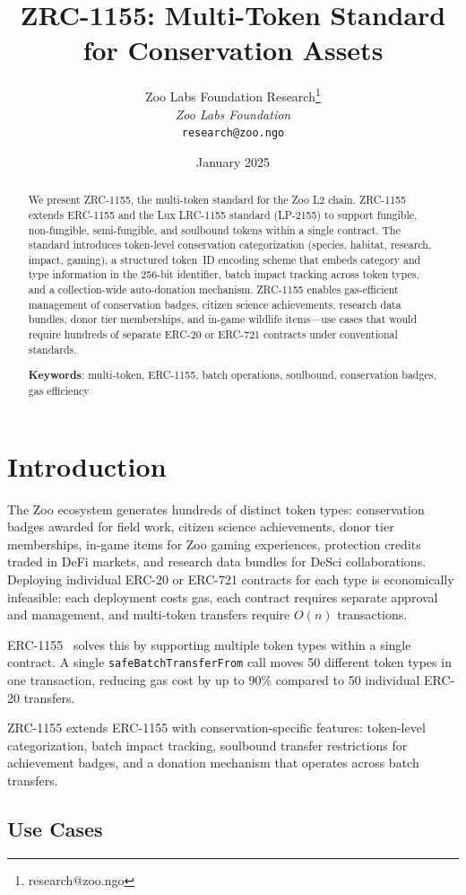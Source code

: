\documentclass[11pt,letterpaper]{article}
\title{\textbf{ZRC-1155: Multi-Token Standard for Conservation Assets}}
\author{
Zoo Labs Foundation Research\thanks{research@zoo.ngo}\\
\textit{Zoo Labs Foundation}\\
\texttt{research@zoo.ngo}
}
\date{January 2025}
\begin{document}
\zoocoverpage

\begin{abstract}
We present ZRC-1155, the multi-token standard for the Zoo L2 chain. ZRC-1155 extends ERC-1155 and the Lux LRC-1155 standard (LP-2155) to support fungible, non-fungible, semi-fungible, and soulbound tokens within a single contract. The standard introduces token-level conservation categorization (species, habitat, research, impact, gaming), a structured token~ID encoding scheme that embeds category and type information in the 256-bit identifier, batch impact tracking across token types, and a collection-wide auto-donation mechanism. ZRC-1155 enables gas-efficient management of conservation badges, citizen science achievements, research data bundles, donor tier memberships, and in-game wildlife items---use cases that would require hundreds of separate ERC-20 or ERC-721 contracts under conventional standards.

\textbf{Keywords}: multi-token, ERC-1155, batch operations, soulbound, conservation badges, gas efficiency
\end{abstract}

\section{Introduction}

The Zoo ecosystem generates hundreds of distinct token types: conservation badges awarded for field work, citizen science achievements, donor tier memberships, in-game items for Zoo gaming experiences, protection credits traded in DeFi markets, and research data bundles for DeSci collaborations. Deploying individual ERC-20 or ERC-721 contracts for each type is economically infeasible: each deployment costs gas, each contract requires separate approval and management, and multi-token transfers require $O(n)$ transactions.

ERC-1155~\cite{erc1155} solves this by supporting multiple token types within a single contract. A single \texttt{safeBatchTransferFrom} call moves 50 different token types in one transaction, reducing gas cost by up to 90\% compared to 50 individual ERC-20 transfers.

ZRC-1155 extends ERC-1155 with conservation-specific features: token-level categorization, batch impact tracking, soulbound transfer restrictions for achievement badges, and a donation mechanism that operates across batch transfers.

\subsection{Use Cases}
\end{document}
